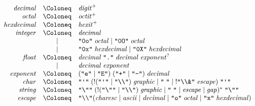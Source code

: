 \begin{align*}
  \begin{array}{rcl}
    \mathit{decimal}
    & \Coloneq & \mathit{digit}^+
    \\
    \mathit{octal}
    & \Coloneq & \mathit{octit}^+
    \\
    \mathit{hexdecimal}
    & \Coloneq & \mathit{hexit}^+
    \\
    \mathit{integer}
    & \Coloneq & \mathit{decimal} \\
    & \mid & \text{\texttt{\textquotedbl 0o\textquotedbl}}\; \mathit{octal} \mid \text{\texttt{\textquotedbl 0O\textquotedbl}}\; \mathit{octal} \\
    & \mid & \text{\texttt{\textquotedbl 0x\textquotedbl}}\; \mathit{hexdecimal} \mid \text{\texttt{\textquotedbl 0X\textquotedbl}}\; \mathit{hexdecimal}
    \\
    \mathit{float}
    & \Coloneq & \mathit{decimal}\; \text{\texttt{\textquotedbl .\textquotedbl}}\; \mathit{decimal}\; \mathit{exponent}^? \\
    & \mid & \mathit{decimal}\; \mathit{exponent}
    \\
    \mathit{exponent}
    & \Coloneq & (\text{\texttt{\textquotedbl e\textquotedbl}} \mid \text{\texttt{\textquotedbl E\textquotedbl}})\; (\text{\texttt{\textquotedbl +\textquotedbl}} \mid \text{\texttt{\textquotedbl -\textquotedbl}})\; \mathit{decimal}
    \\
    \mathit{char}
    & \Coloneq & \text{\texttt{\textquotedbl\textquotesingle\textquotedbl}}\;({!}(\text{\texttt{\textquotedbl\textquotesingle\textquotedbl}} \mid \text{\texttt{\textquotedbl\textbackslash\textbackslash\textquotedbl}})\; \mathit{graphic} \mid \text{\texttt{\textquotedbl\;\textquotedbl}} \mid {!}\text{\texttt{\textquotedbl\textbackslash\textbackslash\&\textquotedbl}}\; \mathit{escape}) \; \text{\texttt{\textquotedbl\textquotesingle\textquotedbl}}
    \\
    \mathit{string}
    & \Coloneq & \text{\texttt{\textquotedbl\textbackslash\textquotedbl\textquotedbl}}\;({!}(\text{\texttt{\textquotedbl\textbackslash\textquotedbl\textquotedbl}} \mid \text{\texttt{\textquotedbl\textbackslash\textbackslash\textquotedbl}})\; \mathit{graphic} \mid \text{\texttt{\textquotedbl\;\textquotedbl}} \mid \mathit{escape} \mid \mathit{gap})^* \; \text{\texttt{\textquotedbl\textbackslash\textquotedbl\textquotedbl}}
    \\
    \mathit{escape}
    & \Coloneq & \text{\texttt{\textquotedbl\textbackslash\textbackslash\textquotedbl}} (\mathit{charesc} \mid \mathit{ascii} \mid \mathit{decimal} \mid \text{\texttt{\textquotedbl o\textquotedbl}}\; \mathit{octal} \mid \text{\texttt{\textquotedbl x\textquotedbl}}\; \mathit{hexdecimal})

\end{array}
\end{align*}
